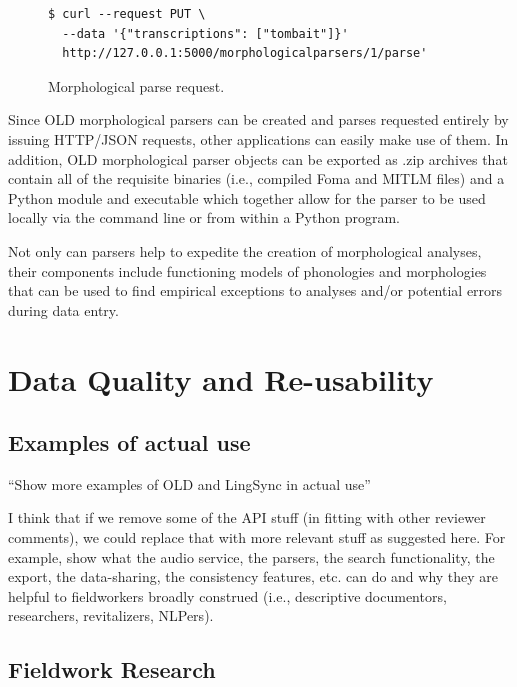 \documentclass[11pt]{article}
\begin{document}
\begin{figure}[h]
\scriptsize
\begin{verbatim}
$ curl --request PUT \
  --data '{"transcriptions": ["tombait"]}'
  http://127.0.0.1:5000/morphologicalparsers/1/parse'
\end{verbatim}
\normalsize
\caption{Morphological parse request.}
\label{old-parse}
\end{figure}

Since OLD morphological parsers can be created and parses requested entirely by
issuing HTTP/JSON requests, other applications can easily make use of them. In
addition, OLD morphological parser objects can be exported as .zip archives
that contain all of the requisite binaries (i.e., compiled Foma and MITLM
files) and a Python module and executable which together allow for the parser
to be used locally via the command line or from within a Python program.

Not only can parsers help to expedite the creation of morphological analyses,
their components include functioning models of phonologies and morphologies that
can be used to find empirical exceptions to analyses and/or potential errors
during data entry.




\section{Data Quality and Re-usability}
\label{open-data}



\subsection{Examples of actual use}

``Show more examples of OLD and LingSync in actual use''

I think that if we remove some of the API stuff (in fitting with other reviewer
comments), we could replace that with more relevant stuff as suggested here. For
example, show what the audio service, the parsers, the search functionality, the
export, the data-sharing, the consistency features, etc. can do and why they are
helpful to fieldworkers broadly construed (i.e., descriptive documentors,
researchers, revitalizers, NLPers).



\subsection{Fieldwork Research}
\end{document}
